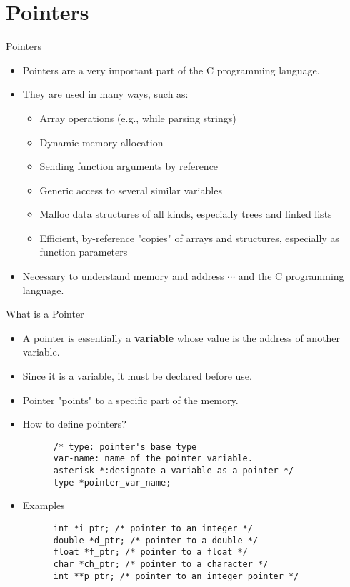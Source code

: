 \documentclass[10pt,t]{beamer}
\begin{document}
\section{Pointers}
\begin{frame}{Pointers}
  \begin{itemize}
  \item Pointers are a very important part of the C programming language.
  \item They are used in many ways, such as:
    \begin{itemize}
    \item Array operations (e.g., while parsing strings)
    \item Dynamic memory allocation
    \item Sending function arguments by reference
    \item Generic access to several similar variables
    \item Malloc data structures of all kinds, especially trees and linked lists
    \item Efficient, by-reference "copies" of arrays and structures, especially as function parameters
    \end{itemize}
  \item Necessary to understand memory and address $\cdots$ and the C programming language.
  \end{itemize}
\end{frame}

\begin{frame}[fragile]{What is a Pointer}
  \begin{itemize}
  \item A pointer is essentially a \textbf{\color{red}variable} whose value is the address of another variable.
  \item Since it is a variable, it must be declared before use.
  \item Pointer "points" to a specific part of the memory.
  \item How to define pointers?
    \begin{lstlisting}
      /* type: pointer's base type
      var-name: name of the pointer variable.
      asterisk *:designate a variable as a pointer */
      type *pointer_var_name;
    \end{lstlisting}
  \item Examples
    \begin{lstlisting}
      int *i_ptr; /* pointer to an integer */
      double *d_ptr; /* pointer to a double */
      float *f_ptr; /* pointer to a float */
      char *ch_ptr; /* pointer to a character */
      int **p_ptr; /* pointer to an integer pointer */
    \end{lstlisting}
  \end{itemize}
\end{frame}
\end{document}

